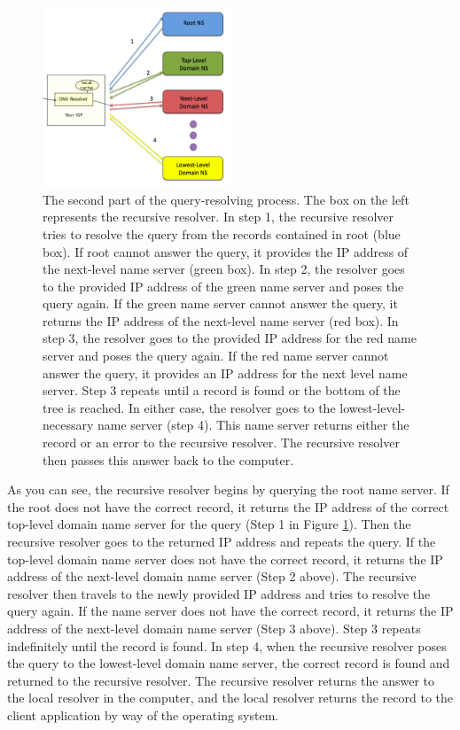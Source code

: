 \documentclass[11pt,a4paper]{article}
\begin{document}
\begin{figure}
	
    \centering
    	\includegraphics[width=0.5\textwidth]{query3.png}
    \caption{The second part of the query-resolving process. The box on the left represents the recursive resolver. In step 1, the recursive resolver tries to resolve the query from the records contained in root (blue box). If root cannot answer the query, it provides the IP address of the next-level name server (green box). In step 2, the resolver goes to the provided IP address of the green name server and poses the query again. If the green name server cannot answer the query, it returns the IP address of the next-level name server (red box). In step 3, the resolver goes to the provided IP address for the red name server and poses the query again. If the red name server cannot answer the query, it provides an IP address for the next level name server. Step 3 repeats until a record is found or the bottom of the tree is reached. In either case, the resolver goes to the lowest-level-necessary name server (step 4). This name server returns either the record or an error to the recursive resolver. The recursive resolver then passes this answer back to the computer.}
    \label{fig:remote}
\end{figure}

As you can see, the recursive resolver begins by querying the root name server.
If the root does not have the correct record, it returns the IP address of the correct top-level domain name server for the query (Step 1 in Figure \ref{fig:remote}).
Then the recursive resolver goes to the returned IP address and repeats the query.
If the top-level domain name server does not have the correct record, it returns the IP address of the next-level domain name server (Step 2 above).
The recursive resolver then travels to the newly provided IP address and tries to resolve the query again.
If the name server does not have the correct record, it returns the IP address of the next-level domain name server (Step 3 above).
Step 3 repeats indefinitely until the record is found.
In step 4, when the recursive resolver poses the query to the lowest-level domain name server, the correct record is found and returned to the recursive resolver.
The recursive resolver returns the answer to the local resolver in the computer, and the local resolver returns the record to the client application by way of the operating system.
\end{document}
